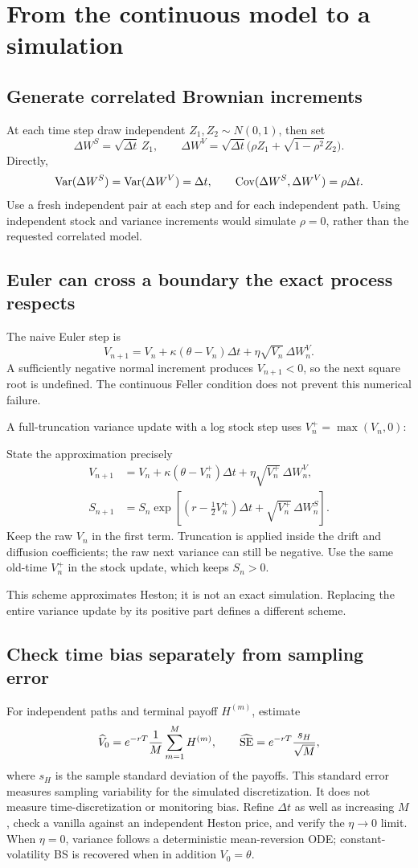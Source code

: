 \documentclass[10pt]{article}
\theoremstyle{definition}\newtheorem{definition}{Definition}[section]
\begin{document}
\section{From the continuous model to a simulation}\label{sec:sim}
\subsection{Generate correlated Brownian increments}
At each time step draw independent \(Z_1,Z_2\sim N(0,1)\), then set
\[
\Delta W^S=\sqrt{\Delta t}\,Z_1,\qquad
\Delta W^V=\sqrt{\Delta t}
\bigl(\rho Z_1+\sqrt{1-\rho^2}Z_2\bigr).
\]
Directly,
\[
\operatorname{Var}(\Delta W^S)=\operatorname{Var}(\Delta W^V)=\Delta t,
\qquad \operatorname{Cov}(\Delta W^S,\Delta W^V)=\rho\Delta t.
\]
Use a fresh independent pair at each step and for each independent path.
Using independent stock and variance increments would simulate \(\rho=0\),
rather than the requested correlated model.

\subsection{Euler can cross a boundary the exact process respects}
The naive Euler step is
\[
V_{n+1}=V_n+\kappa(\theta-V_n)\Delta t
+\eta\sqrt{V_n}\,\Delta W_n^V.
\]
A sufficiently negative normal increment produces \(V_{n+1}<0\), so the
next square root is undefined. The continuous Feller condition does not
prevent this numerical failure.

A full-truncation variance update with a log stock step uses
\(V_n^+=\max(V_n,0)\):
\begin{keyidea}{State the approximation precisely}
\[
\boxed{\begin{aligned}
V_{n+1}&=V_n+\kappa(\theta-V_n^+)\Delta t
+\eta\sqrt{V_n^+}\,\Delta W_n^V,\\
S_{n+1}&=S_n\exp\left[(r-\tfrac12V_n^+)\Delta t
+\sqrt{V_n^+}\,\Delta W_n^S\right].
\end{aligned}}
\]
Keep the raw \(V_n\) in the first term. Truncation is applied inside the
drift and diffusion coefficients; the raw next variance can still be negative.
Use the same old-time \(V_n^+\) in the stock update, which keeps \(S_n>0\).
\end{keyidea}
This scheme approximates Heston; it is not an exact simulation. Replacing
the entire variance update by its positive part defines a different scheme.

\subsection{Check time bias separately from sampling error}
For independent paths and terminal payoff \(H^{(m)}\), estimate
\[
\widehat V_0=e^{-rT}\frac1M\sum_{m=1}^M H^{(m)},
\qquad
\widehat{\rm SE}=e^{-rT}\frac{s_H}{\sqrt M},
\]
where \(s_H\) is the sample standard deviation of the payoffs. This standard
error measures sampling variability for the simulated discretization.
It does not measure time-discretization or monitoring bias. Refine
\(\Delta t\) as well as increasing \(M\), check a vanilla against an
independent Heston price, and verify the \(\eta\to0\) limit. When
\(\eta=0\), variance follows a deterministic mean-reversion ODE;
constant-volatility BS is recovered when in addition \(V_0=\theta\).
\end{document}
